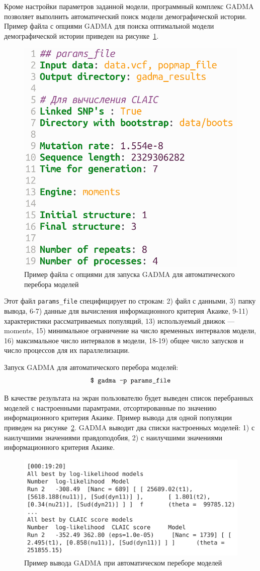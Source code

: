 \documentclass[a4paper,14pt,oneside,openany,article]{memoir}
\begin{document}
Кроме настройки параметров заданной модели, программный комплекс GADMA позволяет выполнить автоматический поиск модели демографической истории.
Пример файла с опциями GADMA для поиска оптимальной модели демографической истории приведен на рисунке~\ref{fig:gadma_str_params}.
\begin{figure}[h]
    \centering
    \includegraphics[width=0.5\linewidth]{images_2/gadma_str_params_file.png}
    \caption{Пример файла с опциями для запуска GADMA для автоматического перебора моделей}
    \label{fig:gadma_str_params}
\end{figure}

Этот файл \texttt{params\_file} специфицирует по строкам: 2) файл с данными, 3) папку вывода, 6-7) данные для вычисления информационного критерия Акаике, 9-11) характеристики рассматриваемых популяций, 13) используемый движок --- moments, 15) минимальное ограничение на число временных интервалов модели, 16) максимальное число интервалов в модели, 18-19) общее число запусков и число процессов для их параллелизации.

Запуск GADMA для автоматического перебора моделей:
$$\text{\texttt{\$ gadma -p params\_file}}$$

В качестве результата на экран пользователю будет выведен список перебранных моделей с настроенными парамтрами, отсортированные по значению информационного критерия Акаике. Пример вывода для одной популяции приведен на рисунке~\ref{fig:gadma_str_output}.
GADMA выводит два списки настроенных моделей: 1) с наилучшими значениями правдоподобия, 2) с наилучшими значениями информационного критерия Акаике.

\begin{figure}[h]
    \centering
    \includegraphics[width=0.7\linewidth]{images_2/gadma_str_output.png}
    \caption{Пример вывода GADMA при автоматическом переборе моделей}
    \label{fig:gadma_str_output}
\end{figure}
\end{document}
